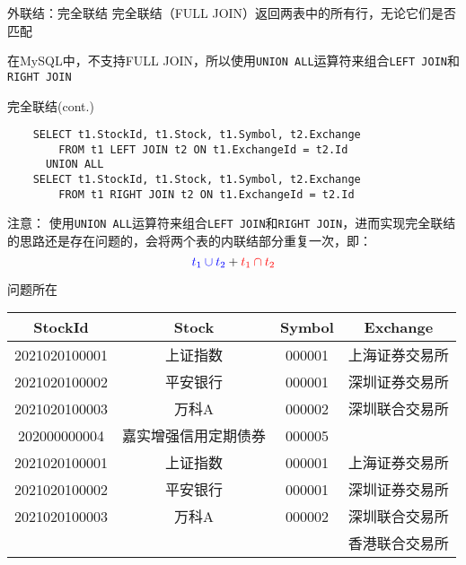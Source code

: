 \documentclass[t]{beamer}
\begin{document}
\begin{frame}[fragile]{外联结：完全联结}
完全联结（FULL JOIN）返回两表中的所有行，无论它们是否匹配

\begin{center}
\end{center}  

在MySQL中，不支持FULL JOIN，所以使用\verb|UNION ALL|运算符来组合\verb|LEFT JOIN|和\verb|RIGHT JOIN|
\end{frame}

\begin{frame}[fragile]{完全联结(cont.)}
  \begin{lstlisting}
    SELECT t1.StockId, t1.Stock, t1.Symbol, t2.Exchange 
        FROM t1 LEFT JOIN t2 ON t1.ExchangeId = t2.Id
      UNION ALL
    SELECT t1.StockId, t1.Stock, t1.Symbol, t2.Exchange 
        FROM t1 RIGHT JOIN t2 ON t1.ExchangeId = t2.Id
    \end{lstlisting}

\begin{block}{注意：}
  使用\verb|UNION ALL|运算符来组合\verb|LEFT JOIN|和\verb|RIGHT JOIN|，进而实现{\color{blue}完全联结}的思路还是存在问题的，会将两个表的{\color{red}内联结部分}重复一次，即：
\[{\color{blue}t_1\cup t_2} + {\color{red}t_1\cap t_2}\]
\end{block}

\end{frame}



\begin{frame}[fragile]{问题所在}
\begin{center}
\begin{tabular}{cccc}
  \hline
  StockId& Stock& Symbol& Exchange\\
  \hline
  2021020100001& 上证指数&000001 &上海证券交易所\\
  2021020100002& 平安银行&000001 &深圳证券交易所\\
  2021020100003 &万科A& 000002 &深圳联合交易所\\
  202000000004 &嘉实增强信用定期债券&000005  \\
  \color{red}2021020100001& \color{red}上证指数&\color{red}000001& \color{red}上海证券交易所\\
  \color{red} 2021020100002 &\color{red}平安银行&\color{red}000001& \color{red}深圳证券交易所\\
  \color{red} 2021020100003 &\color{red}万科A &\color{red}000002& \color{red}深圳联合交易所\\
  &&& 香港联合交易所\\
  \hline
\end{tabular}
\end{center}
\end{frame}
\end{document}
